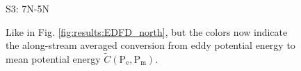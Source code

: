 \documentclass{ametsoc}
\begin{document}
\begin{figure}[h!]
\begin{minipage}[]{0.32\textwidth}
\centering S3: 7N-5N \\		
	\end{minipage}
	\caption{Like in Fig. \ref{fig:results:EDFD_north}, but the colors now indicate the along-stream averaged conversion from eddy potential energy to mean potential energy $\tilde{C}(\text{P}_\text{e},\text{P}_\text{m})$.}
	\label{fig:results:conversion_north}
\end{figure}
\end{document}
